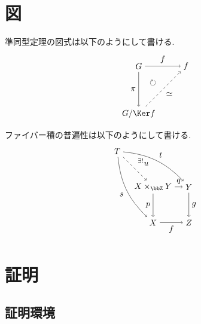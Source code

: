 \documentclass[10pt]{ltjsarticle}
\begin{document}
\section{図}

準同型定理の図式は以下のようにして書ける.
\begin{align}
	\begin{tikzpicture}[auto]
		\node (G) at (0, 2) {$G$};
		\node (Imf) at (2, 2) {$\Im f$};
		\node (GKerf) at (0, 0) {$G/\Ker f$};
		\node (Circle) at (0.6, 1.3) {$\circlearrowright$};
		\draw[->] (G) to node {$f$} (Imf);
		\draw[->] (G) to node[swap] {$\pi$} (GKerf);
		\draw[->, dashed] (GKerf) to node[swap] {$\simeq$} (Imf);
	\end{tikzpicture}
\end{align}
ファイバー積の普遍性は以下のようにして書ける.
\begin{align}
	\begin{tikzpicture}[auto]
		\node (T) at (0, 3) {$T$};
		\node (X) at (1.5, 0) {$X$};
		\node (XxY) at (1.5, 1.5) {$X\times_{\bbZ}Y$};
		\node (Z) at (3, 0) {$Z$};
		\node (Y) at (3, 1.5) {$Y$};
		\draw[->, dashed] (T) to node {${}^{\exists!}u$} (XxY);
		\draw[->] (T) to[bend left=20] node {$t$} (Y);
		\draw[->] (T) to[bend right=20] node[swap] {$s$} (X);
		\draw[->] (XxY) to node {$q$} (Y);
		\draw[->] (XxY) to node[swap] {$p$} (X);
		\draw[->] (Y) to node {$g$} (Z);
		\draw[->] (X) to node[swap] {$f$} (Z);
	\end{tikzpicture}
\end{align}


\section{証明}
\subsection{証明環境}
\lipsum[2]
\newpage


\printbibliography[title=参考文献]
\end{document}
